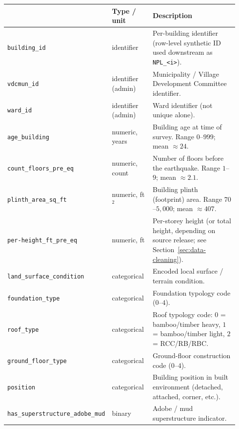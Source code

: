\documentclass[11pt,a4paper]{article}
\begin{document}
\begin{longtable}{
>{\scriptsize\ttfamily\RaggedRight\arraybackslash}p{0.34\linewidth}
p{0.18\linewidth}
p{0.42\linewidth}
}
\toprule
{\normalsize\normalfont\bfseries Raw variable} &
\textbf{Type / unit} &
\textbf{Description} \\
\midrule
\endhead
\texttt{building\_id}                          & identifier              & Per-building identifier (row-level synthetic ID used downstream as \texttt{NPL\_<i>}). \\
\texttt{vdcmun\_id}                            & identifier (admin)      & Municipality / Village Development Committee identifier. \\
\texttt{ward\_id}                              & identifier (admin)      & Ward identifier (not unique alone). \\
\texttt{age\_building}                         & numeric, years          & Building age at time of survey. Range $0$--$999$; mean $\approx 24$. \\
\texttt{count\_floors\_pre\_eq}                & numeric, count          & Number of floors before the earthquake. Range $1$--$9$; mean $\approx 2.1$. \\
\texttt{plinth\_area\_sq\_ft}                  & numeric, ft$^2$         & Building plinth (footprint) area. Range $70$--$5{,}000$; mean $\approx 407$. \\
\texttt{per-height\_ft\_pre\_eq}               & numeric, ft             & Per-storey height (or total height, depending on source release; see Section~\ref{sec:data-cleaning}). \\
\texttt{land\_surface\_condition}              & categorical             & Encoded local surface / terrain condition. \\
\texttt{foundation\_type}                      & categorical             & Foundation typology code ($0$--$4$). \\
\texttt{roof\_type}                            & categorical             & Roof typology code: $0$ = bamboo/timber heavy, $1$ = bamboo/timber light, $2$ = RCC/RB/RBC. \\
\texttt{ground\_floor\_type}                   & categorical             & Ground-floor construction code ($0$--$4$). \\
\texttt{position}                              & categorical             & Building position in built environment (detached, attached, corner, etc.). \\
\texttt{has\_superstructure\_adobe\_mud}       & binary                  & Adobe / mud superstructure indicator. \\

\end{longtable}
\end{document}
